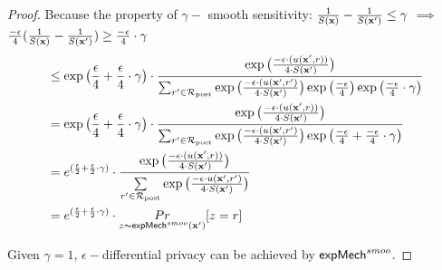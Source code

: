 \documentclass{article}
\begin{document}
\begin{proof}
  Because the property of $\gamma -$ smooth sensitivity: $\frac{1}{S(\textbf{x})} - \frac{1}{S(\textbf{x}')} \leq \gamma$ $\implies$
  $\frac{- \epsilon}{4}
  (\frac{1}{S(\textbf{x})}-
  \frac{1}{S(\textbf{x}')}) \geq \frac{- \epsilon}{4} \cdot \gamma$
  \begin{equation*}
  \begin{split}
  & \leq \exp\big( \frac{\epsilon}{4} + \frac{\epsilon}{4} \cdot \gamma\big) \cdot 
  \frac {
  \exp
  \big(
  \frac{-\epsilon\cdot(u(\textbf{x}', {r}))}{4\cdot S(\textbf{x}')}
  \big)
  } 
  {
  \sum_{r'\in \mathcal{R}_{\textup{post}}} 
  \exp 
  \big(
  \frac{-\epsilon\cdot(u(\textbf{x}', {r'})}{4 \cdot S(\textbf{x}')}
  \big)
  \exp 
  \big(
  \frac{-\epsilon}{4}
  \big)
  \exp
  \big(
  \frac{- \epsilon}{4} \cdot \gamma
  \big)
  }\\
  & = \exp\big( \frac{\epsilon}{4} + \frac{\epsilon}{4} \cdot \gamma\big) \cdot 
  \frac {
  \exp
  \big(
  \frac{-\epsilon\cdot(u(\textbf{x}', {r}))}{4\cdot S(\textbf{x}')}
  \big)
  } 
  {
  \sum_{r'\in \mathcal{R}_{\textup{post}}} 
  \exp 
  \big(
  \frac{-\epsilon\cdot(u(\textbf{x}', {r'})}{4 \cdot S(\textbf{x}')}
  \big)
  \exp 
  \big(
  \frac{-\epsilon}{4} +   \frac{- \epsilon}{4} \cdot \gamma
  \big)
  }\\
  & = e^{( \frac{\epsilon}{2} + \frac{\epsilon}{2} \cdot \gamma )} \cdot 
  \frac {
  \exp
  \big(
  \frac{-\epsilon\cdot(u(\textbf{x}', {r}))}{4\cdot S(\textbf{x}')}
  \big)
  } 
  {
  \sum\limits_{r'\in \mathcal{R}_{\textup{post}}} \exp \big(\frac{-\epsilon\cdot u(\textbf{x}', r')}{4 \cdot S(\textbf{x}')}\big)
  }\\
  & = e^{( \frac{\epsilon}{2} + \frac{\epsilon}{2} \cdot \gamma )} \cdot   \underset{z \thicksim \mathsf{expMech}^{smoo}(\textbf{x}')}{Pr}[z = r]
  \end{split}
  \end{equation*}

  Given $\gamma = 1$, $\epsilon - $differential privacy can be achieved by $\mathsf{expMech}^{smoo}$.


\end{proof}
\end{document}
